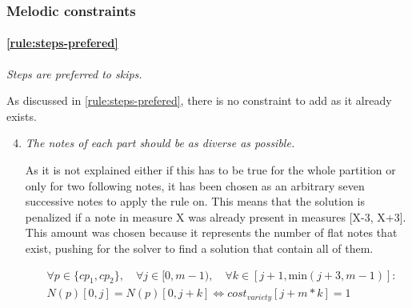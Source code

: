 \subsubsection{Melodic constraints}
\paragraph{\hspace{.6cm}\ref{rule:steps-prefered}} \textit{Steps are preferred to skips.}

As discussed in \ref{rule:steps-prefered}, there is no constraint to add as it already exists.

\begin{enumerate}[wide, label=\bfseries 1.M\arabic*]
\setcounter{enumi}{3} %
    \item\label{constraint:variety} \reddot \textit{The notes of each part should be as diverse as possible.}

    As it is not explained either if this has to be true for the whole partition or only for two following notes, it has been chosen as an arbitrary seven successive notes to apply the rule on. This means that the solution is penalized if a note in measure X was already present in measures [X-3, X+3]. This amount was chosen because it represents the number of flat notes that exist, pushing for the solver to find a solution that contain all of them.

    \begin{equation} \begin{aligned}
    &\forall p \in \{cp_1, cp_2\}, \quad \forall j \in [0, m-1), \quad \forall k \in [j+1, \text{min} (j+3, m-1)] :\\ 
    &N(p)[0, j] = N(p)[0, j+k]\iff cost_{variety}[j+m*k]= 1
    \end{aligned} \end{equation}
\end{enumerate}

